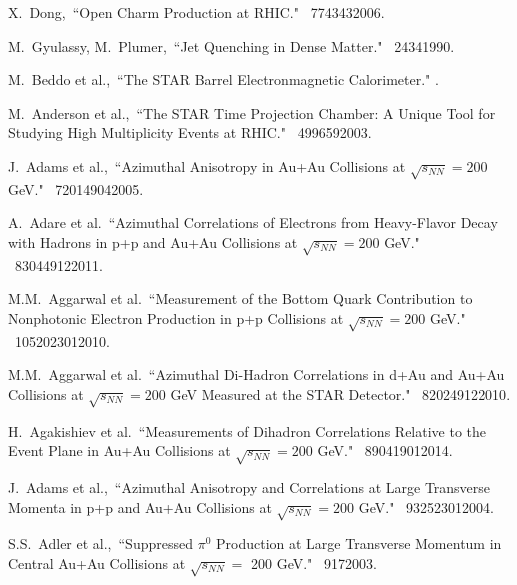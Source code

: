 \begin{thebibliography}{1000}

X.~Dong,~``Open Charm Production at RHIC." \Journal{\NPA} {~774}{343}{2006}.

M.~Gyulassy, M.~Plumer,~``Jet Quenching in Dense Matter." \Journal{\PLB} {~243}{4}{1990}.

M.~Beddo et al.,~``The STAR Barrel Electronmagnetic Calorimeter." .

M.~Anderson et al.,~``The STAR Time Projection Chamber: A Unique Tool for Studying High Multiplicity Events at RHIC." \Journal{\NIM } {~499}{659}{2003}.

J.~Adams et al.,~``Azimuthal Anisotropy in Au+Au Collisions at $\sqrt{s_{NN}} = 200$ GeV." \Journal{\PRC} {~72}{014904}{2005}.

A.~Adare et al.~``Azimuthal Correlations of Electrons from Heavy-Flavor Decay with Hadrons in p+p and Au+Au Collisions at $\sqrt{s_{NN}} = 200$ GeV." \Journal{\PRC} {~83}{044912}{2011}.

M.M.~Aggarwal et al.~``Measurement of the Bottom Quark Contribution to Nonphotonic Electron Production in p+p Collisions at $\sqrt{s_{NN}} = 200$ GeV." \Journal{\PRL} {~105}{202301}{2010}.

M.M.~Aggarwal et al.~``Azimuthal Di-Hadron Correlations in d+Au and Au+Au Collisions at $\sqrt{s_{NN}} = 200$ GeV Measured at the STAR Detector." \Journal{\PRC} {~82}{024912}{2010}.

H.~Agakishiev et al.~``Measurements of Dihadron Correlations Relative to the Event Plane in Au+Au Collisions at $\sqrt{s_{NN}} = 200$ GeV." \Journal{\PRC} {~89}{041901}{2014}.

J.~Adams et al.,~``Azimuthal Anisotropy and Correlations at Large Transverse Momenta in p+p and Au+Au Collisions at $\sqrt{s_{NN}} = 200$ GeV." \Journal{\PRL} {~93}{252301}{2004}.

S.S.~Adler et al.,~``Suppressed $\pi^0$ Production at Large Transverse Momentum in Central Au+Au Collisions at $\sqrt{s_{NN}} = $ 200 GeV." \Journal{\PRL} {~91}{7}{2003}.

\end{thebibliography}
